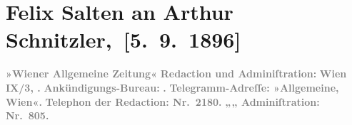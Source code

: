 

         
         \renewcommand{\erwaehntePersonen}{Personen: Ferdinand Raimund, Julian Sternberg}
         \renewcommand{\erwaehnteInstitutionen}{Institutionen: Südbahnstrecke, Wiener Allgemeine Zeitung}
         \renewcommand{\erwaehnteOrte}{Orte: Raimund-Theater, Schulerstraße, Universitätsstraße, Wien}
         \renewcommand{\erwaehnteWerke}{Werke: Das Mädchen aus der Feenwelt oder Der Bauer als Millionär}
               \section[ Felix Salten an Arthur Schnitzler, {[}5. 9. 1896{]}]{ Felix Salten an Arthur Schnitzler, {[}5. 9. 1896{]}}\nopagebreak{}\rehead{ }\begin{ledgroupsized}[t]{13cm}\normalsize\beginnumbering \toendnotes[C]{\smallbreak\pagebreak[2]} 
\toendnotes[C]{\smallbreak}\pstart
           \noindent{}{\pb}\textcolor{gray}{\textbf{\textbf{»Wiener Allgemeine
                        Zeitung«}}}\pend
           \pstart
           \textcolor{gray}{\textbf{Redaction und Adminiſtration:}}\pend
           \pstart
           \textcolor{gray}{\textbf{Wien}}\pend
           \pstart
           \textcolor{gray}{\textbf{\textbf{IX}/3,{ }\textbf{}\textbf{.}}}\pend
           \pstart
           \textcolor{gray}{\textbf{Ankündigungs-Bureau:}}\pend
           \pstart
           \textcolor{gray}{\textbf{\textbf{.
                     }}}\pend
           \pstart
           \textcolor{gray}{\textbf{Telegramm-Adreſſe: »Allgemeine, Wien«.}}\pend
           \pstart
           \textcolor{gray}{\textbf{Telephon der Redaction: Nr. 2180.}}\pend
           \pstart
           \textcolor{gray}{\textbf{\hspace*{1.5em}„\hspace*{1.5em}„\hspace*{1.5em} Adminiſtration: Nr. 805.}}\pend

\end{ledgroupsized}
